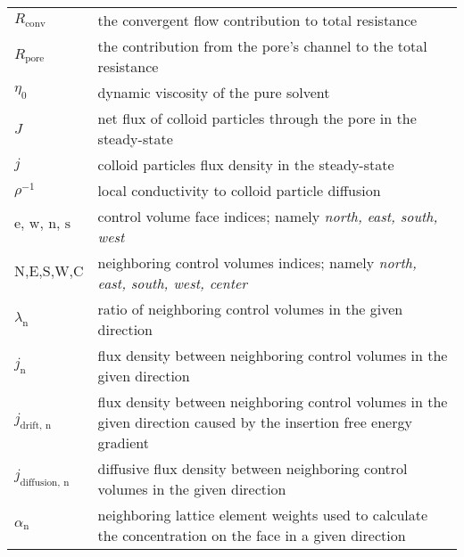 \documentclass[10pt, a4paper]{article}
\begin{document}
\begin{tabularx}{\linewidth}{l l}
$R_{\textrm{conv}}$ & the convergent flow contribution to total resistance \\
$R_{\textrm{pore}}$ & the contribution from the pore's channel to the total resistance \\
$\eta_{0}$ & dynamic viscosity of the pure solvent \\
$J$ & net flux of colloid particles through the pore in the steady-state \\
$j$ & colloid particles flux density in the steady-state \\
$\rho^{-1}$ & local conductivity to colloid particle diffusion \\
$\textrm{e, w, n, s}$ & control volume face indices; namely \textit{north, east, south, west} \\
$\textrm{N,E,S,W,C}$ & neighboring control volumes indices; namely \textit{north, east, south, west, center} \\
$\lambda_{\textrm{n}}$ & ratio of neighboring control volumes in the given direction \\
$j_{\textrm{n}}$ & flux density between neighboring control volumes in the given direction \\
$j_{\textrm{drift, n}}$ & flux density between neighboring control volumes in the given direction caused by the insertion free energy gradient\\
$j_{\textrm{diffusion, n}}$ & diffusive flux density between neighboring control volumes in the given direction \\
$\alpha_{\textrm{n}}$ & neighboring lattice element weights used to calculate the concentration on the face in a given direction \\

\end{tabularx}
\end{document}
